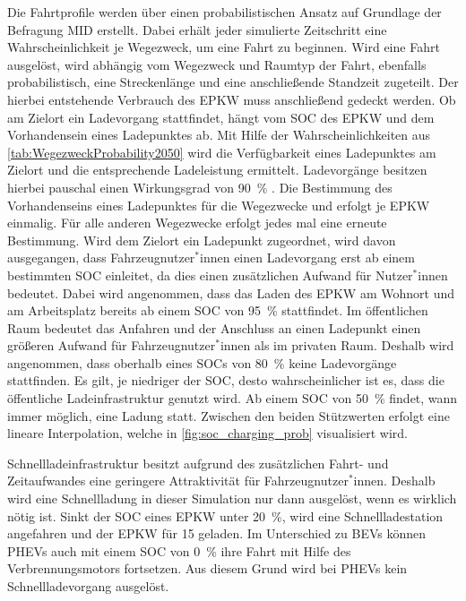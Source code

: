 Die Fahrtprofile werden über einen probabilistischen Ansatz auf Grundlage der Befragung \gls{MID} erstellt.
Dabei erhält jeder simulierte Zeitschritt eine Wahrscheinlichkeit je Wegezweck, um eine Fahrt zu beginnen.
Wird eine Fahrt ausgelöst, wird abhängig vom Wegezweck und Raumtyp der Fahrt, ebenfalls probabilistisch, eine Streckenlänge und eine anschließende Standzeit zugeteilt.
Der hierbei entstehende Verbrauch des \gls{EPKW} muss anschließend gedeckt werden.
Ob am Zielort ein Ladevorgang stattfindet, hängt vom \gls{SOC} des \gls{EPKW} und dem Vorhandensein eines Ladepunktes ab.
Mit Hilfe der Wahrscheinlichkeiten aus \autoref{tab:WegezweckProbability2050} wird die Verfügbarkeit eines Ladepunktes am Zielort und die entsprechende Ladeleistung ermittelt.
Ladevorgänge besitzen hierbei pauschal einen Wirkungsgrad von \SI{90}{\percent} \cite{EliaGroup2020}.
Die Bestimmung des Vorhandenseins eines Ladepunktes für die Wegezwecke \nH und \Arbeit erfolgt je \gls{EPKW} einmalig.
Für alle anderen Wegezwecke erfolgt jedes mal eine erneute Bestimmung.
Wird dem Zielort ein Ladepunkt zugeordnet, wird davon ausgegangen, dass Fahrzeugnutzer\(^*\)innen einen Ladevorgang erst ab einem bestimmten \gls{SOC} einleitet, da dies einen zusätzlichen Aufwand für Nutzer\(^*\)innen bedeutet.
Dabei wird angenommen, dass das Laden des \gls{EPKW} am Wohnort und am Arbeitsplatz bereits ab einem \gls{SOC} von \SI{95}{\percent} stattfindet.
Im öffentlichen Raum bedeutet das Anfahren und der Anschluss an einen Ladepunkt einen größeren Aufwand für Fahrzeugnutzer\(^*\)innen als im privaten Raum.
Deshalb wird angenommen, dass oberhalb eines \glspl{SOC} von \SI{80}{\percent} keine Ladevorgänge stattfinden.
Es gilt, je niedriger der \gls{SOC}, desto wahrscheinlicher ist es, dass die öffentliche Ladeinfrastruktur genutzt wird.
Ab einem \gls{SOC} von \SI{50}{\percent} findet, wann immer möglich, eine Ladung statt.
Zwischen den beiden Stützwerten erfolgt eine lineare Interpolation, welche in \autoref{fig:soc_charging_prob} visualisiert wird.



Schnellladeinfrastruktur besitzt aufgrund des zusätzlichen Fahrt- und Zeitaufwandes eine geringere Attraktivität für Fahrzeugnutzer\(^*\)innen.
Deshalb wird eine Schnellladung in dieser Simulation nur dann ausgelöst, wenn es wirklich nötig ist.
Sinkt der \gls{SOC} eines \gls{EPKW} unter \SI{20}{\percent}, wird eine Schnellladestation angefahren und der \gls{EPKW} für \SI{15}{\Minuten} geladen.
Im Unterschied zu \glspl{BEV} können \glspl{PHEV} auch mit einem \gls{SOC} von \SI{0}{\percent} ihre Fahrt mit Hilfe des Verbrennungsmotors fortsetzen.
Aus diesem Grund wird bei \glspl{PHEV} kein Schnellladevorgang ausgelöst.\medskip

